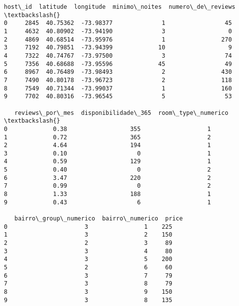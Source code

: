 \documentclass[11pt]{article}
\begin{document}
    \begin{Verbatim}[commandchars=\\\{\}]
   host\_id  latitude  longitude  minimo\_noites  numero\_de\_reviews  \textbackslash{}
0     2845  40.75362  -73.98377              1                 45
1     4632  40.80902  -73.94190              3                  0
2     4869  40.68514  -73.95976              1                270
3     7192  40.79851  -73.94399             10                  9
4     7322  40.74767  -73.97500              3                 74
5     7356  40.68688  -73.95596             45                 49
6     8967  40.76489  -73.98493              2                430
7     7490  40.80178  -73.96723              2                118
8     7549  40.71344  -73.99037              1                160
9     7702  40.80316  -73.96545              5                 53

   reviews\_por\_mes  disponibilidade\_365  room\_type\_numerico  \textbackslash{}
0             0.38                  355                   1
1             0.72                  365                   2
2             4.64                  194                   1
3             0.10                    0                   1
4             0.59                  129                   1
5             0.40                    0                   2
6             3.47                  220                   2
7             0.99                    0                   2
8             1.33                  188                   1
9             0.43                    6                   1

   bairro\_group\_numerico  bairro\_numerico  price
0                      3                1    225
1                      3                2    150
2                      2                3     89
3                      3                4     80
4                      3                5    200
5                      2                6     60
6                      3                7     79
7                      3                8     79
8                      3                9    150
9                      3                8    135
    \end{Verbatim}
\end{document}

